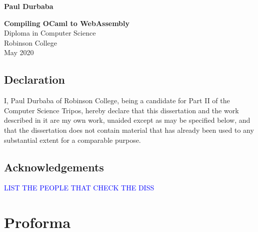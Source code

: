 \documentclass[12pt,twoside,notitlepage]{report}
\newcommand\note[1]{\textcolor{blue}{#1}}
\begin{document}


\pagestyle{empty}

\hfill{\LARGE \bf Paul Durbaba}

\vspace*{60mm}
\begin{center}
\Huge
{\bf Compiling OCaml to WebAssembly} \\
\vspace*{5mm}
Diploma in Computer Science \\
\vspace*{5mm}
Robinson College \\
\vspace*{5mm}
May 2020  %
\end{center}

\clearpage


 
\newpage
\section*{Declaration}

I, Paul Durbaba of Robinson College, being a candidate for Part II of the Computer
Science Tripos, hereby declare
that this dissertation and the work described in it are my own work,
unaided except as may be specified below, and that the dissertation
does not contain material that has already been used to any substantial
extent for a comparable purpose.

\bigskip
{}

\medskip
{}

\section*{Acknowledgements}

\note{LIST THE PEOPLE THAT CHECK THE DISS}


\setcounter{page}{1}
\pagestyle{plain}

\chapter*{Proforma}
\end{document}
